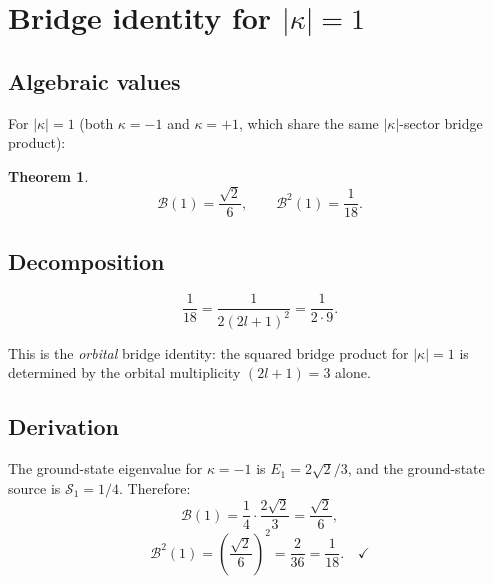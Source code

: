 \documentclass[11pt,letterpaper]{article}
\newtheorem{theorem}{Theorem}[section]
\numberwithin{equation}{section}
\begin{document}
\section{Bridge identity for $|\kappa| = 1$}
\label{sec:kappa1}

\subsection{Algebraic values}

For $|\kappa| = 1$ (both $\kappa = -1$ and $\kappa = +1$, which share the
same $|\kappa|$-sector bridge product):

\begin{theorem}
\begin{equation}
\label{eq:bridge_k1}
  \mathcal{B}(1) = \frac{\sqrt{2}}{6}, \qquad
  \mathcal{B}^2(1) = \frac{1}{18}.
\end{equation}
\end{theorem}

\subsection{Decomposition}

\begin{equation}
\label{eq:k1_decomp}
\boxed{
  \frac{1}{18} = \frac{1}{2(2l+1)^2} = \frac{1}{2 \cdot 9}.
}
\end{equation}

This is the \emph{orbital} bridge identity: the squared bridge product for
$|\kappa| = 1$ is determined by the orbital multiplicity $(2l+1) = 3$ alone.

\subsection{Derivation}

The ground-state eigenvalue for $\kappa = -1$ is $E_1 = 2\sqrt{2}/3$, and
the ground-state source is $\mathcal{S}_1 = 1/4$. Therefore:
\begin{equation}
  \mathcal{B}(1) = \frac{1}{4} \cdot \frac{2\sqrt{2}}{3} = \frac{\sqrt{2}}{6},
\end{equation}
\begin{equation}
  \mathcal{B}^2(1) = \left(\frac{\sqrt{2}}{6}\right)^2 = \frac{2}{36} = \frac{1}{18}. \quad \checkmark
\end{equation}
\end{document}
